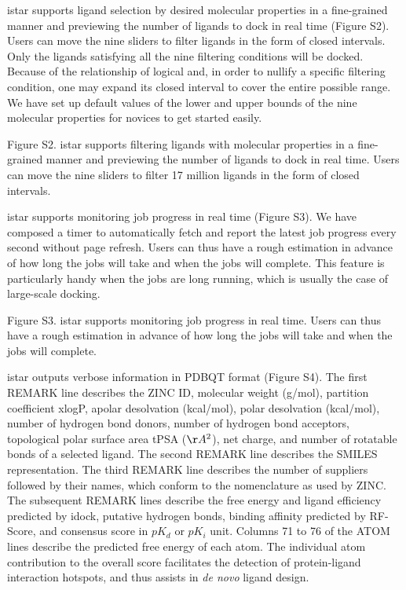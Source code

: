 istar supports ligand selection by desired molecular properties in a fine-grained manner and previewing the number of ligands to dock in real time (Figure S2). Users can move the nine sliders to filter ligands in the form of closed intervals. Only the ligands satisfying all the nine filtering conditions will be docked. Because of the relationship of logical and, in order to nullify a specific filtering condition, one may expand its closed interval to cover the entire possible range. We have set up default values of the lower and upper bounds of the nine molecular properties for novices to get started easily.

Figure S2. istar supports filtering ligands with molecular properties in a fine-grained manner and previewing the number of ligands to dock in real time. Users can move the nine sliders to filter 17 million ligands in the form of closed intervals.

istar supports monitoring job progress in real time (Figure S3). We have composed a timer to automatically fetch and report the latest job progress every second without page refresh. Users can thus have a rough estimation in advance of how long the jobs will take and when the jobs will complete. This feature is particularly handy when the jobs are long running, which is usually the case of large-scale docking.

Figure S3. istar supports monitoring job progress in real time. Users can thus have a rough estimation in advance of how long the jobs will take and when the jobs will complete.

istar outputs verbose information in PDBQT format (Figure S4). The first REMARK line describes the ZINC ID, molecular weight (g/mol), partition coefficient xlogP, apolar desolvation (kcal/mol), polar desolvation (kcal/mol), number of hydrogen bond donors, number of hydrogen bond acceptors, topological polar surface area tPSA ($\AA^2$), net charge, and number of rotatable bonds of a selected ligand. The second REMARK line describes the SMILES representation. The third REMARK line describes the number of suppliers followed by their names, which conform to the nomenclature as used by ZINC. The subsequent REMARK lines describe the free energy and ligand efficiency predicted by idock, putative hydrogen bonds, binding affinity predicted by RF-Score, and consensus score in $pK_d$ or $pK_i$ unit. Columns 71 to 76 of the ATOM lines describe the predicted free energy of each atom. The individual atom contribution to the overall score facilitates the detection of protein-ligand interaction hotspots, and thus assists in \textit{de novo} ligand design.

